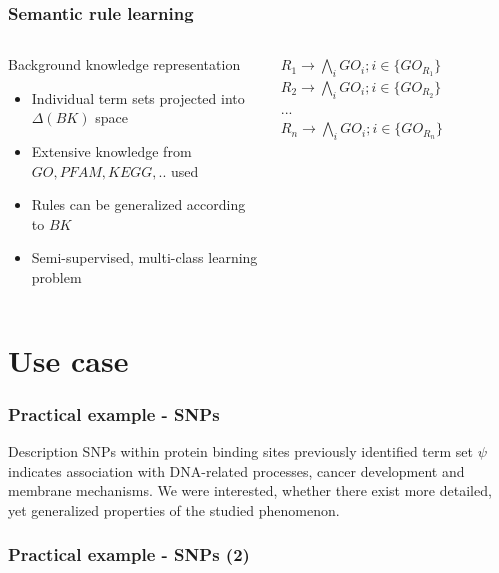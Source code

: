 \documentclass{beamer}
\begin{document}
  \begin{frame}\frametitle{Semantic rule learning}

      \begin{columns}
    \begin{column}{0.5\textwidth}

  \begin{block}{Background knowledge representation}
    \begin{itemize}

    \item Individual term sets projected into $\Delta(BK)$ space
    \item Extensive knowledge from $GO,PFAM, KEGG,..$ used
    \item Rules can be generalized according to $BK$
    \item Semi-supervised, multi-class learning problem
      
    \end{itemize}
  \end{block}
      \end{column}
    \begin{column}{0.5\textwidth}  %
      \begin{center}
        $R_{1} \rightarrow \bigwedge_{i}GO_{i}; i \in \{GO_{R_{1}}\}$
        $R_{2} \rightarrow \bigwedge_{i}GO_{i}; i \in \{GO_{R_{2}}\}$\\
        $...$\\
        \medskip
        $R_{n} \rightarrow \bigwedge_{i}GO_{i}; i \in \{GO_{R_{n}}\}$
      \end{center}
    \end{column}
    \end{columns}

  \end{frame}
\section{Use case} 
  \begin{frame}\frametitle{Practical example - SNPs}

    \begin{block}{Description}
      SNPs within protein binding sites previously identified term set $\psi$ indicates association with DNA-related processes, cancer development and membrane mechanisms. We were interested, whether there exist more detailed, yet generalized properties of the studied phenomenon.
    \end{block}
  \end{frame}


  \begin{frame}\frametitle{Practical example - SNPs (2)}


  \end{frame}
\end{document}
